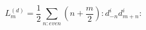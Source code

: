 \begin{equation}
L_{m}^{(d)}=\frac{1}{2}\sum_{n:even}(n+\frac{m}{2}):d_{-n}^{i}d_{m+n}^{i}:
\end{equation}

